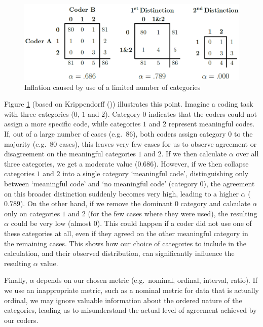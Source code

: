 \documentclass[
]{book}
\begin{document}
\begin{figure}
\includegraphics[width=1\linewidth]{figure/kripp} \caption{Inflation caused by use of a limited number of categories}\label{fig:kripp}
\end{figure}

Figure \ref{fig:kripp} (based on Krippendorff ()) illustrates this point. Imagine a coding task with three categories (\(0\), \(1\) and \(2\)). Category \(0\) indicates that the coders could not assign a more specific code, while categories \(1\) and \(2\) represent meaningful codes. If, out of a large number of cases (e.g.~\(86\)), both coders assign category \(0\) to the majority (e.g.~\(80\) cases), this leaves very few cases for us to observe agreement or disagreement on the meaningful categories \(1\) and \(2\). If we then calculate \(\alpha\) over all three categories, we get a moderate value (\(0.686\)). However, if we then collapse categories \(1\) and \(2\) into a single category `meaningful code', distinguishing only between `meaningful code' and `no meaningful code' (category \(0\)), the agreement on this broader distinction suddenly becomes very high, leading to a higher \(\alpha\) (\(0.789\)). On the other hand, if we remove the dominant \(0\) category and calculate \(\alpha\) only on categories \(1\) and \(2\) (for the few cases where they were used), the resulting \(\alpha\) could be very low (almost \(0\)). This could happen if a coder did not use one of these categories at all, even if they agreed on the other meaningful category in the remaining cases. This shows how our choice of categories to include in the calculation, and their observed distribution, can significantly influence the resulting \(\alpha\) value.

Finally, \(\alpha\) depends on our chosen metric (e.g.~nominal, ordinal, interval, ratio). If we use an inappropriate metric, such as a nominal metric for data that is actually ordinal, we may ignore valuable information about the ordered nature of the categories, leading us to misunderstand the actual level of agreement achieved by our coders.
\end{document}
